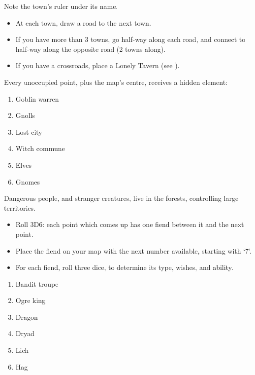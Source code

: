 \begin{multicols}{2}
Note the town's ruler under its name.


\begin{itemize}
\item
  At each town, draw a road to the next town.
\item
  If you have more than 3 towns, go half-way along each road, and
  connect to half-way along the opposite road (2 towns along).
\item
  If you have a crossroads, place a Lonely Tavern (see ).
\end{itemize}


Every unoccupied point, plus the map's centre, receives a hidden
element:

\begin{multicols}{2}
\begin{enumerate}
\item
  Goblin warren
\item
  Gnolls
\item
  Lost city
\item
  Witch commune
\item
  Elves
\item
  Gnomes
\end{enumerate}
\end{multicols}


Dangerous people, and stranger creatures, live in the forests, controlling large territories.

\begin{itemize}
\item
  Roll 3D6: each point which comes up has one fiend between it and the
  next point.
\item
  Place the fiend on your map with the next number available, starting
  with `7'.
\item
  For each fiend, roll three dice, to determine its type, wishes, and
  ability.
\end{itemize}


\begin{multicols}{2}
\begin{enumerate}
\item
  Bandit troupe
\item
  Ogre king
\item
  Dragon
\item
  Dryad
\item
  Lich
\item
  Hag
\end{enumerate}
\end{multicols}


\end{multicols}

